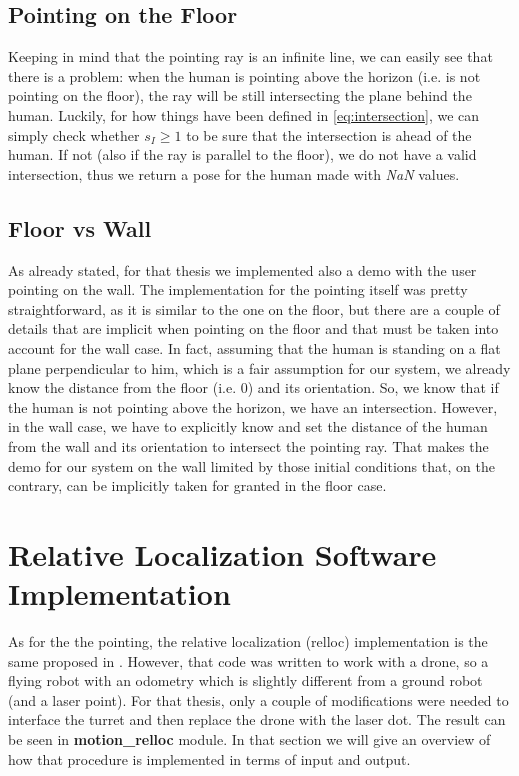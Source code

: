 \subsection{Pointing on the Floor}
Keeping in mind that the pointing ray is an infinite line, we can easily see that there is a problem: when the human is pointing above the horizon (i.e. is not pointing on the floor), the ray will be still intersecting the plane behind the human. Luckily, for how things have been defined in \ref{eq:intersection}, we can simply check whether $s_I \geq 1$ to be sure that the intersection is ahead of the human. If not (also if the ray is parallel to the floor), we do not have a valid intersection, thus we return a pose for the human made with \emph{NaN} values.
\subsection{Floor vs Wall}
As already stated, for that thesis we implemented also a demo with the user pointing on the wall. The implementation for the pointing itself was pretty straightforward, as it is similar to the one on the floor, but there are a couple of details that are implicit when pointing on the floor and that must be taken into account for the wall case. In fact, assuming that the human is standing on a flat plane perpendicular to him, which is a fair assumption for our system, we already know the distance from the floor (i.e. $0$) and its orientation. So, we know that if the human is not pointing above the horizon, we have an intersection. However, in the wall case, we have to explicitly know and set the distance of the human from the wall and its orientation to intersect the pointing ray. That makes the demo for our system on the wall limited by those initial conditions that, on the contrary, can be implicitly taken for granted in the floor case.


\section{Relative Localization Software Implementation}
As for the the pointing, the relative localization (relloc) implementation is the same proposed in \cite{gromov2018robot}. However, that code was written to work with a drone, so a flying robot with an odometry which is slightly different from a ground robot (and a laser point). For that thesis, only a couple of modifications were needed to interface the turret and then replace the drone with the laser dot. The result can be seen in \textbf{motion\_relloc} module. In that section we will give an overview of how that procedure is implemented in terms of input and output.
